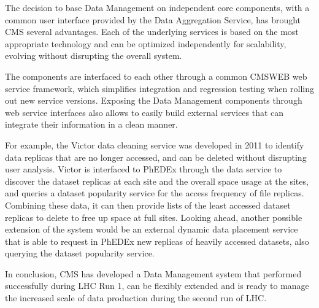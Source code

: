 The decision to base Data Management on independent core components, with a common user interface provided by the Data Aggregation Service, has brought CMS several advantages.
Each of the underlying services is based on the most appropriate technology and can be optimized independently for scalability, evolving without disrupting the overall system.

The components are interfaced to each other through a common CMSWEB web service framework, which simplifies integration and regression testing when rolling out new service versions.
Exposing the Data Management components through web service interfaces also allows to easily build external services that can integrate their information in a clean manner.

For example, the Victor \cite{victor} data cleaning service was developed in 2011 to identify data replicas that are no longer accessed, and can be deleted without disrupting user analysis.
Victor is interfaced to PhEDEx through the data service to discover the dataset replicas at each site and the overall space usage at the sites, and queries a dataset popularity service for the access frequency of file replicas. Combining these data, it can then provide lists of the least accessed dataset replicas to delete to free up space at full sites.
Looking ahead, another possible extension of the system would be an external dynamic data placement service that is able to request in PhEDEx new replicas of heavily accessed datasets, also querying the dataset popularity service.

In conclusion, CMS has developed a Data Management system that performed successfully during LHC Run 1, can be flexibly extended and is ready to manage the increased scale of data production during the second run of LHC.